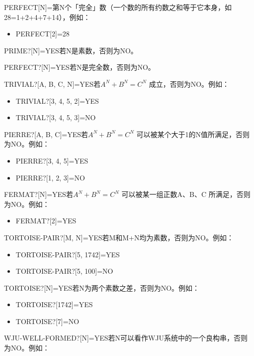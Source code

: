 \documentclass[
  12pt,
  twoside,
  openright,
  oldfontcommands,
]{memoir}
\providecommand{\tightlist}{%
  \setlength{\itemsep}{0pt}\setlength{\parskip}{0pt}}
\begin{document}
PERFECT{[}N{]}=第N个「完全」数（一个数的所有约数之和等于它本身，如28=1+2+4+7+14），例如：

\begin{itemize}
\tightlist
\item
  PERFECT{[}2{]}=28
\end{itemize}

PRIME?{[}N{]}=YES若N是素数，否则为NO。

PERFECT?{[}N{]}=YES若N是完全数，否则为NO。

TRIVIAL?{[}A, B, C,
N{]}=YES若$A^N+B^N=C^N$
成立，否则为NO。例如：

\begin{itemize}
\tightlist
\item
  TRIVIAL?{[}3, 4, 5, 2{]}=YES
\item
  TRIVIAL?{[}3, 4, 5, 3{]}=NO
\end{itemize}

PIERRE?{[}A, B,
C{]}=YES若$A^N+B^N=C^N$
可以被某个大于1的N值所满足，否则为NO。例如：

\begin{itemize}
\tightlist
\item
  PIERRE?{[}3, 4, 5{]}=YES
\item
  PIERRE?{[}1, 2, 3{]}=NO
\end{itemize}

FERMAT?{[}N{]}=YES若$A^N+B^N=C^N$
可以被某一组正数A、B、C 所满足，否则为NO。例如：

\begin{itemize}
\tightlist
\item
  FERMAT?{[}2{]}=YES
\end{itemize}

TORTOISE-PAIR?{[}M, N{]}=YES若M和M+N均为素数，否则为NO。例如：

\begin{itemize}
\tightlist
\item
  TORTOISE-PAIR?{[}5, 1742{]}=YES
\item
  TORTOISE-PAIR?{[}5, 100{]}=NO
\end{itemize}

TORTOISE?{[}N{]}=YES若N为两个素数之差，否则为NO。例如：

\begin{itemize}
\tightlist
\item
  TORTOISE?{[}1742{]}=YES
\item
  TORTOISE?{[}7{]}=NO
\end{itemize}

WJU-WELL-FORMED?{[}N{]}=YES若N可以看作WJU系统中的一个良构串，否则为NO。例如：
\end{document}
